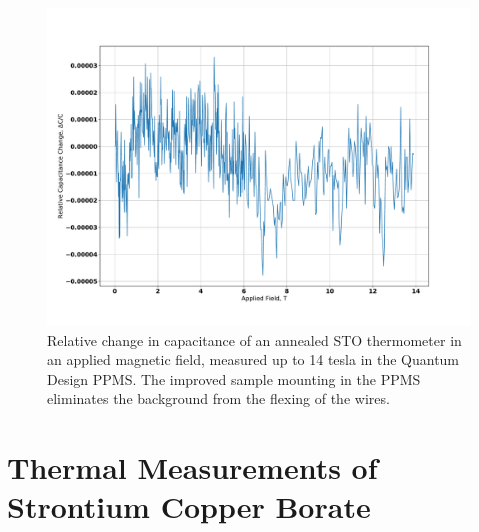 \documentclass{thesis-umich}
\begin{document}
\begin{figure} \caption[Field response of an annealed STO thermometer]{Relative change in capacitance of an annealed STO
	thermometer in an applied magnetic field, measured up to 14 tesla in
the Quantum Design PPMS. The improved sample mounting in the PPMS eliminates
the background from the flexing of the wires.}
\includegraphics[width=\columnwidth]{figures/annealed_sto_dc_vs_b.pdf}
\end{figure}
	
\chapter{Thermal Measurements of Strontium Copper Borate}
\end{document}
